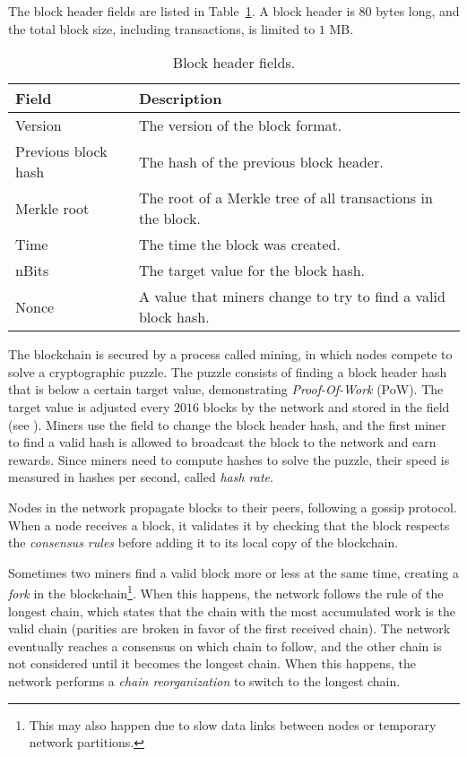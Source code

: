 The block header fields are listed in Table~\ref{tab:block-header}. A block
header is \(80\) bytes long, and the total block size, including transactions,
is limited to \(1\) MB.

\begin{table}[tbhp]
	\centering
	\begin{tabularx}{\linewidth}{|l|X|}
		\toprule
		\textbf{Field} & \textbf{Description} \\
		\midrule
		Version & The version of the block format. \\
		\midrule
		Previous block hash & The hash of the previous block header. \\
		\midrule
		Merkle root & The root of a Merkle tree of all transactions in
		the block. \\
		\midrule
		Time & The time the block was created. \\
		\midrule
		nBits & The target value for the block hash. \\
		\midrule
		Nonce & A value that miners change to try to find a valid block
		hash. \\
		\bottomrule
	\end{tabularx}
	\caption{Block header fields.}\label{tab:block-header}
\end{table}

The blockchain is secured by a process called mining, in which nodes compete to
solve a cryptographic puzzle. The puzzle consists of finding a block header
hash that is below a certain target value, demonstrating \emph{Proof-Of-Work}
(PoW). The target value is adjusted every \(2016\) blocks by the network and
stored in the  field (see
). Miners use the 
field to change the block header hash, and the first miner to find a valid hash
is allowed to broadcast the block to the network and earn rewards. Since miners
need to compute hashes to solve the puzzle, their speed is measured in hashes
per second, called \emph{hash rate}.

Nodes in the network propagate blocks to their peers, following a gossip
protocol. When a node receives a block, it validates it by checking that the
block respects the \emph{consensus rules} before adding it to its local copy of
the blockchain.

Sometimes two miners find a valid block more or less at the same time, creating
a \emph{fork} in the blockchain\footnote{This may also happen due to slow data
links between nodes or temporary network partitions.}. When this happens, the
network follows the rule of the longest chain, which states that the chain with
the most accumulated work  is the valid chain (parities are broken in favor of
the first received chain). The network eventually reaches a consensus on which
chain to follow, and the other chain is not considered until it becomes the
longest chain. When this happens, the network performs a \emph{chain
reorganization} to switch to the longest chain.

